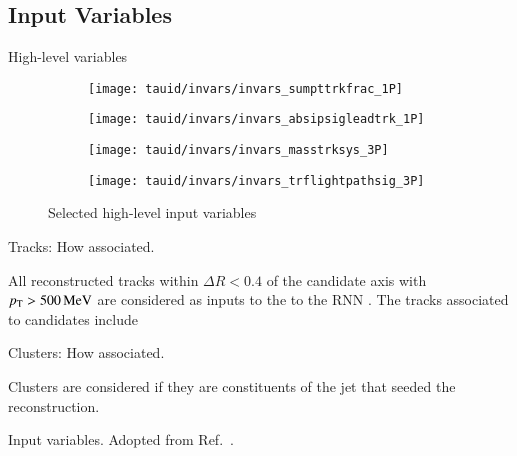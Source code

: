 \subsection{Input Variables}

High-level variables



\begin{figure}[htbp]
  \centering

  \begin{subfigure}{0.48\textwidth}
    \centering

    \texttt{[image: tauid/invars/invars\_sumpttrkfrac\_1P]}
    \subcaption{}
  \end{subfigure}%
  \begin{subfigure}{0.48\textwidth}
    \centering

    \texttt{[image: tauid/invars/invars\_absipsigleadtrk\_1P]}
    \subcaption{}
  \end{subfigure}

  \begin{subfigure}{0.48\textwidth}
    \centering

    \texttt{[image: tauid/invars/invars\_masstrksys\_3P]}
    \subcaption{}
  \end{subfigure}%
  \begin{subfigure}{0.48\textwidth}
    \centering

    \texttt{[image: tauid/invars/invars\_trflightpathsig\_3P]}
    \subcaption{}
  \end{subfigure}

  \caption{Selected high-level input variables}%
  \label{fig:tauid_high_level_vars}
\end{figure}


Tracks: How associated.

All reconstructed tracks within $\Delta R < 0.4$ of the \tauhadvis
candidate axis with $p_{\text{T}} > \SI{500}{\ensuremath{\text{MeV}}}$ are considered as inputs to
the to the RNN \tauid. The tracks associated to \tauhadvis candidates
include

Clusters: How associated.

Clusters are considered if they are
constituents of the jet that seeded the \tauhadvis reconstruction.




\begin{table}[htbp]
  \centering

  \caption{Input variables. Adopted from
    Ref.~\cite{ATL-PHYS-PUB-2019-033}.}%
  \label{tab:tauid_input_variables}

  
\end{table}


